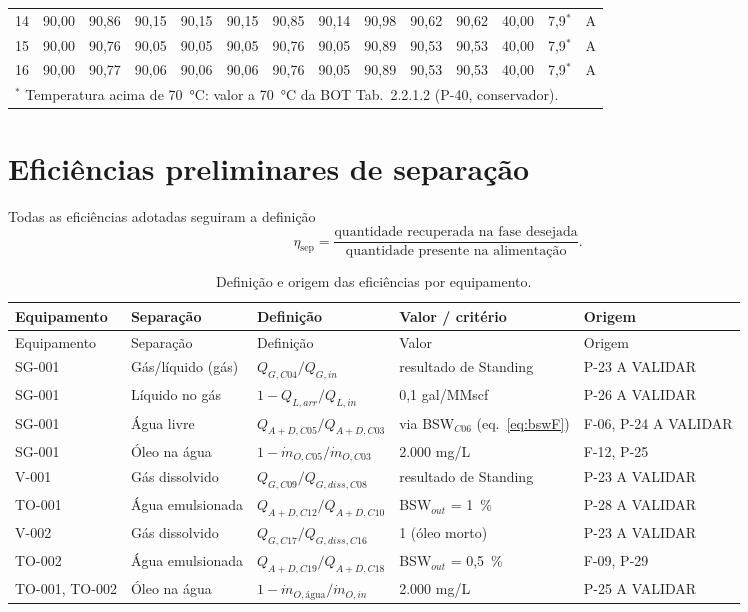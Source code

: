 \documentclass[11pt,a4paper]{article}
\numberwithin{equation}{section}
\numberwithin{table}{section}
\numberwithin{figure}{section}
\newcommand{\tipo}[1]{\textsf{\footnotesize #1}}
\newcommand{\AV}{\textcolor{red!70!black}{\tipo{A VALIDAR}}}
\begin{document}
\begin{landscape}
\begin{longtable}{rrrrrrrrrrrrrr}
14 & 90,00 & 90,86 & 90,15 & 90,15 & 90,15 & 90,85 & 90,14 & 90,98 & 90,62 & 90,62 & 40,00 & 7,9$^*$ & A\\
15 & 90,00 & 90,76 & 90,05 & 90,05 & 90,05 & 90,76 & 90,05 & 90,89 & 90,53 & 90,53 & 40,00 & 7,9$^*$ & A\\
16 & 90,00 & 90,77 & 90,06 & 90,06 & 90,06 & 90,76 & 90,05 & 90,89 & 90,53 & 90,53 & 40,00 & 7,9$^*$ & A\\
\bottomrule
\multicolumn{14}{l}{\footnotesize $^*$ Temperatura acima de 70~\si{\celsius}: valor a 70~\si{\celsius} da BOT Tab.~2.2.1.2 (P-40, conservador).}
\end{longtable}
\end{landscape}

\section{Eficiências preliminares de separação}\label{sec:efic}
Todas as eficiências adotadas seguiram a definição
\begin{equation}
\eta_{\mathrm{sep}}=\frac{\text{quantidade recuperada na fase desejada}}{\text{quantidade presente na alimentação}}.
\end{equation}
\begin{longtable}{lL{2.8cm}L{4.4cm}L{3.0cm}L{2.2cm}}
\caption{Definição e origem das eficiências por equipamento.}\label{tab:efic}\\\toprule
Equipamento & Separação & Definição & Valor / critério & Origem\\\midrule\endfirsthead
\toprule Equipamento & Separação & Definição & Valor & Origem\\\midrule\endhead
SG-001 & Gás/líquido (gás) & $Q_{G,C04}/Q_{G,in}$ & resultado de Standing & P-23 \AV\\
SG-001 & Líquido no gás & $1-Q_{L,arr}/Q_{L,in}$ & 0,1 gal/MMscf & P-26 \AV\\
SG-001 & Água livre & $Q_{A+D,C05}/Q_{A+D,C03}$ & via BSW$_{C06}$ (eq.~\ref{eq:bswF}) & F-06, P-24 \AV\\
SG-001 & Óleo na água & $1-\dot m_{O,C05}/\dot m_{O,C03}$ & 2.000 mg/L & F-12, P-25\\
V-001 & Gás dissolvido & $Q_{G,C09}/Q_{G,diss,C08}$ & resultado de Standing & P-23 \AV\\
TO-001 & Água emulsionada & $Q_{A+D,C12}/Q_{A+D,C10}$ & BSW$_{out}$ = 1~\% & P-28 \AV\\
V-002 & Gás dissolvido & $Q_{G,C17}/Q_{G,diss,C16}$ & 1 (óleo morto) & P-23 \AV\\
TO-002 & Água emulsionada & $Q_{A+D,C19}/Q_{A+D,C18}$ & BSW$_{out}$ = 0,5~\% & F-09, P-29\\
TO-001, TO-002 & Óleo na água & $1-\dot m_{O,\text{água}}/\dot m_{O,in}$ & 2.000 mg/L & P-25 \AV\\
\bottomrule\end{longtable}
\end{document}
